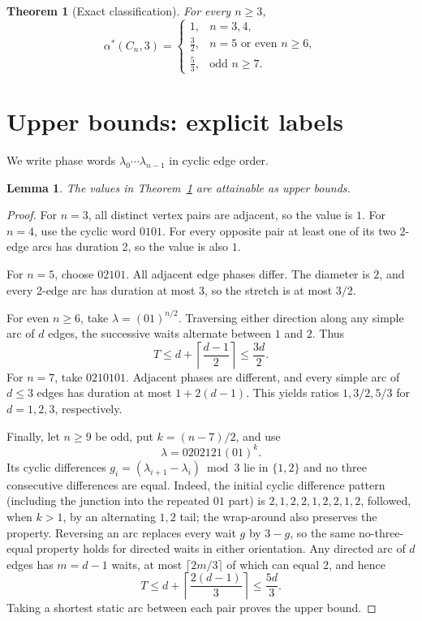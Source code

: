 \documentclass[10pt,a4paper]{article}
\newtheorem{theorem}{Theorem}
\newtheorem{lemma}{Lemma}
\newcommand{\opt}{\alpha^*}
\begin{document}
\begin{theorem}[Exact classification]\label{thm:main}
For every $n\ge3$,
\[
\boxed{\opt(C_n,3)=\begin{cases}
1, & n=3,4,\\
\tfrac32,&n=5\text{ or even }n\ge6,\\
\tfrac53,&\text{odd }n\ge7.
\end{cases}}
\]
\end{theorem}

\section{Upper bounds: explicit labels}
We write phase words $\lambda_0\cdots\lambda_{n-1}$ in cyclic edge order.

\begin{lemma}\label{lem:upper}
The values in Theorem~\ref{thm:main} are attainable as upper bounds.
\end{lemma}
\begin{proof}
For $n=3$, all distinct vertex pairs are adjacent, so the value is $1$. For $n=4$, use the cyclic word $0101$. For every opposite pair at least one of its two 2-edge arcs has duration 2, so the value is also $1$.

For $n=5$, choose $02101$. All adjacent edge phases differ. The diameter is $2$, and every 2-edge arc has duration at most $3$, so the stretch is at most $3/2$.

For even $n\ge6$, take $\lambda=(01)^{n/2}$. Traversing either direction along any simple arc of $d$ edges, the successive waits alternate between $1$ and $2$. Thus
\[
T\le d+\left\lceil\frac{d-1}{2}\right\rceil\le\frac{3d}{2}.
\]
For $n=7$, take $0210101$. Adjacent phases are different, and every simple arc of $d\le3$ edges has duration at most $1+2(d-1)$. This yields ratios $1,3/2,5/3$ for $d=1,2,3$, respectively.

Finally, let $n\ge9$ be odd, put $k=(n-7)/2$, and use
\[
\lambda=0202121(01)^k.
\]
Its cyclic differences $g_i=(\lambda_{i+1}-\lambda_i)\bmod3$ lie in $\{1,2\}$ and no three consecutive differences are equal. Indeed, the initial cyclic difference pattern (including the junction into the repeated $01$ part) is $2,1,2,2,1,2,2,1,2$, followed, when $k>1$, by an alternating $1,2$ tail; the wrap-around also preserves the property. Reversing an arc replaces every wait $g$ by $3-g$, so the same no-three-equal property holds for directed waits in either orientation. Any directed arc of $d$ edges has $m=d-1$ waits, at most $\lceil2m/3\rceil$ of which can equal $2$, and hence
\[
T\le d+\left\lceil\frac{2(d-1)}3\right\rceil\le\frac{5d}{3}.
\]
Taking a shortest static arc between each pair proves the upper bound.
\end{proof}
\end{document}
